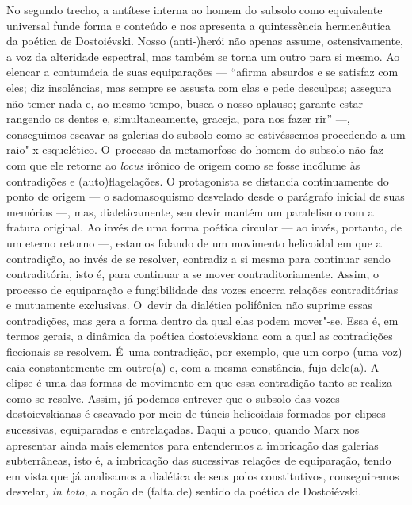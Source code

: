 No segundo trecho, a antítese interna ao homem do subsolo como
equivalente universal funde forma e conteúdo e nos apresenta a
quintessência hermenêutica da poética de Dostoiévski. Nosso \mbox{(anti-)herói}
não apenas assume, ostensivamente, a voz da alteridade espectral, mas
também se torna um outro para si mesmo. Ao elencar a contumácia de suas
equiparações --- ``afirma absurdos e se satisfaz com eles; diz
insolências, mas sempre se assusta com elas e pede desculpas; assegura
não temer nada e, ao mesmo tempo, busca o nosso aplauso; garante estar
rangendo os dentes e, simultaneamente, graceja, para nos fazer rir'' ---,
conseguimos escavar as galerias do subsolo como se estivéssemos
procedendo a um raio"-x esquelético. O~processo da metamorfose do homem
do subsolo não faz com que ele retorne ao \emph{locus} irônico de origem
como se fosse incólume às contradições e (auto)flagelações. O
protagonista se distancia continuamente do ponto de origem --- o
sadomasoquismo desvelado desde o parágrafo inicial de suas memórias ---,
mas, dialeticamente, seu devir mantém um paralelismo com a fratura
original. Ao invés de uma forma poética circular --- ao invés, portanto,
de um eterno retorno ---, estamos falando de um movimento helicoidal em
que a contradição, ao invés de se resolver, contradiz a si mesma para
continuar sendo contraditória, isto é, para continuar a se mover
contraditoriamente. Assim, o processo de equiparação e fungibilidade das
vozes encerra relações contraditórias e mutuamente exclusivas. O~devir
da dialética polifônica não suprime essas contradições, mas gera a forma
dentro da qual elas podem mover"-se. Essa é, em termos gerais, a dinâmica
da poética dostoievskiana com a qual as contradições ficcionais se
resolvem. É~uma contradição, por exemplo, que um corpo (uma voz) caia
constantemente em outro(a) e, com a mesma constância, fuja dele(a). A
elipse é uma das formas de movimento em que essa contradição tanto se
realiza como se resolve. Assim, já podemos entrever que o subsolo das
vozes dostoievskianas é escavado por meio de túneis helicoidais formados
por elipses sucessivas, equiparadas e entrelaçadas. Daqui a pouco,
quando Marx nos apresentar ainda mais elementos para entendermos a
imbricação das galerias subterrâneas, isto é, a imbricação das
sucessivas relações de equiparação, tendo em vista que já analisamos a
dialética de seus polos constitutivos, conseguiremos desvelar, \emph{in
toto}, a noção de (falta de) sentido da poética de Dostoiévski.

